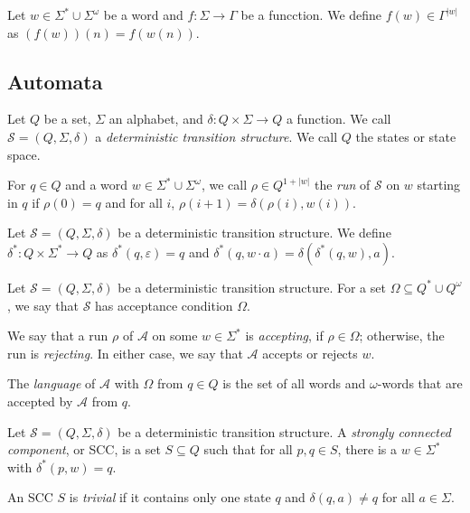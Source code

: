 \begin{defn}
	Let $w \in \Sigma^* \cup \Sigma^\omega$ be a word and $f : \Sigma \rightarrow \Gamma$ be a funcction. We define $f(w) \in \Gamma^{|w|}$ as $(f(w))(n) = f(w(n))$.
\end{defn}


\subsection{Automata}

\begin{defn}
	Let $Q$ be a set, $\Sigma$ an alphabet, and $\delta : Q \times \Sigma \rightarrow Q$ a function. We call $\mathcal{S} = (Q, \Sigma, \delta)$ a \emph{deterministic transition structure}. We call $Q$ the states or state space.
	
	For $q \in Q$ and a word $w \in \Sigma^* \cup \Sigma^\omega$, we call $\rho \in Q^{1+|w|}$ the \emph{run} of $\mathcal{S}$ on $w$ starting in $q$ if $\rho(0) = q$ and for all $i$, $\rho(i+1) = \delta(\rho(i), w(i))$.
\end{defn}

\begin{defn}
	Let $\mathcal{S} = (Q, \Sigma, \delta)$ be a deterministic transition structure. We define $\delta^* : Q \times \Sigma^* \rightarrow Q$ as $\delta^*(q, \varepsilon) = q$ and $\delta^*(q, w \cdot a) = \delta(\delta^*(q, w), a)$.
\end{defn}

\begin{defn}
	Let $\mathcal{S} = (Q, \Sigma, \delta)$ be a deterministic transition structure. For a set $\Omega \subseteq Q^* \cup Q^\omega$, we say that $\mathcal{S}$ has acceptance condition $\Omega$.
	
	We say that a run $\rho$ of $\mathcal{A}$ on some $w \in \Sigma^*$ is \emph{accepting}, if $\rho \in \Omega$; otherwise, the run is \emph{rejecting}. In either case, we say that $\mathcal{A}$ accepts or rejects $w$. 
	
	The \emph{language} of $\mathcal{A}$ with $\Omega$ from $q \in Q$ is the set of all words and $\omega$-words that are accepted by $\mathcal{A}$ from $q$.
\end{defn}

\begin{defn}
	Let $\mathcal{S} = (Q, \Sigma, \delta)$ be a deterministic transition structure. A \emph{strongly connected component}, or SCC, is a set $S \subseteq Q$ such that for all $p, q \in S$, there is a $w \in \Sigma^*$ with $\delta^*(p, w) = q$.
	
	An SCC $S$ is \emph{trivial} if it contains only one state $q$ and $\delta(q, a) \neq q$ for all $a \in \Sigma$.
\end{defn}

